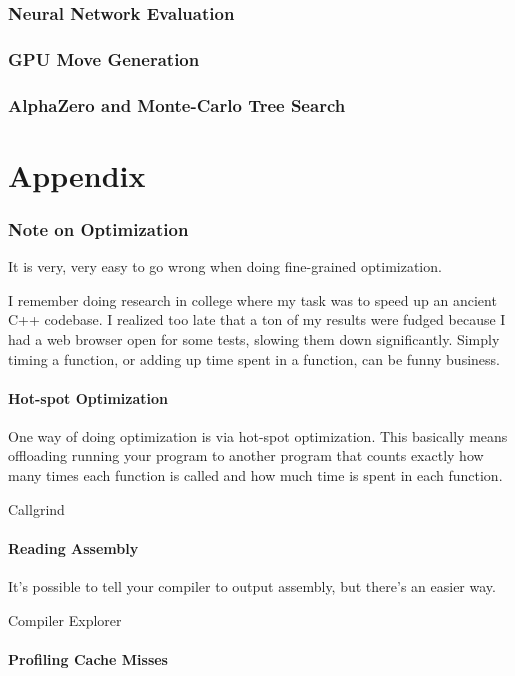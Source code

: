 \documentclass{article}
\begin{document}
\section{Neural Network Evaluation}

\section{GPU Move Generation}

\section{AlphaZero and Monte-Carlo Tree Search}

\newpage
\part{Appendix}
\section{Note on Optimization}

It is very, very easy to go wrong when doing fine-grained optimization.

I remember doing research in college where my task was to speed up an ancient C++ codebase. I realized too late that a ton of my results were fudged because I had a web browser open for some tests, slowing them down significantly. Simply timing a function, or adding up time spent in a function, can be funny business.

\subsection{Hot-spot Optimization}

One way of doing optimization is via hot-spot optimization. This basically means offloading running your program to another program that counts exactly how many times each function is called and how much time is spent in each function.

Callgrind

\subsection{Reading Assembly}

It's possible to tell your compiler to output assembly, but there's an easier way.

Compiler Explorer


\subsection{Profiling Cache Misses}
\end{document}
